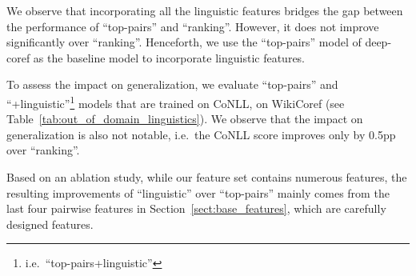 We observe that incorporating all the linguistic features bridges the gap between the performance of 
``top-pairs'' and ``ranking''.
However, it does not improve significantly over ``ranking''.
Henceforth, 
we use the ``top-pairs'' model of deep-coref as the baseline model to incorporate linguistic features.

To assess the impact on generalization, 
we evaluate ``top-pairs'' and ``+linguistic''\footnote{i.e.\ ``top-pairs+linguistic''} models that are trained on CoNLL,
on WikiCoref (see Table~\ref{tab:out_of_domain_linguistics}).
We observe that
the impact on generalization is also not notable, i.e.\
the CoNLL score improves only by 0.5pp over ``ranking''.
  
\begin{table}[htbp]
    \begin{center}\footnotesize
    \end{center}
    \caption{Out-of-domain evaluation of deep-coref models on the WikiCoref dataset.
	}
    \label{tab:out_of_domain_linguistics}
\end{table}


Based on an ablation study, while our feature set contains numerous features, the resulting improvements of ``linguistic'' over ``top-pairs'' mainly comes from the last four pairwise features in Section~\ref{sect:base_features},
which are carefully designed features.
